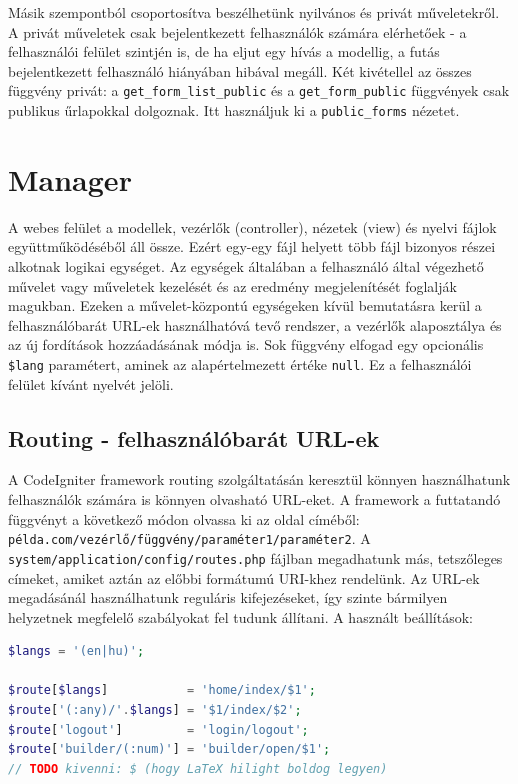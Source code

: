 \documentclass[12pt,a4paper,twoside]{article}
\begin{document}
Másik szempontból csoportosítva beszélhetünk nyilvános és privát műveletekről. A
privát műveletek csak bejelentkezett felhasználók számára elérhetőek - a
felhasználói felület szintjén is, de ha eljut egy hívás a modellig,
a futás bejelentkezett felhasználó hiányában hibával megáll. Két kivétellel az
összes függvény privát: a \texttt{get\_form\_list\_public} és a
\texttt{get\_form\_public} függvények csak publikus űrlapokkal dolgoznak. Itt
használjuk ki a \texttt{public\_forms} nézetet.


\section{Manager}

A webes felület a modellek, vezérlők (controller), nézetek (view) és nyelvi fájlok
együttműködéséből áll össze. Ezért egy-egy fájl helyett több fájl bizonyos
részei alkotnak logikai egységet. Az egységek általában a felhasználó által
végezhető művelet vagy műveletek kezelését és az eredmény megjelenítését foglalják
magukban. Ezeken a művelet-központú egységeken kívül bemutatásra kerül a
felhasználóbarát URL-ek használhatóvá tevő rendszer, a vezérlők alaposztálya
és az új fordítások hozzáadásának módja is. Sok függvény elfogad egy opcionális
\texttt{\$lang} paramétert, aminek az alapértelmezett értéke \texttt{null}. Ez a
felhasználói felület kívánt nyelvét jelöli.


\subsection{Routing - felhasználóbarát URL-ek}

A CodeIgniter framework routing\cite{CI-Routing} szolgáltatásán keresztül
könnyen használhatunk felhasználók számára is könnyen olvasható URL-eket.
A framework a futtatandó függvényt a következő módon olvassa ki az oldal
címéből: \texttt{példa.com/vezérlő/függvény/paraméter1/paraméter2}.
A \texttt{system/application/config/routes.php} fájlban megadhatunk más,
tetszőleges címeket, amiket aztán az előbbi formátumú URI-khez rendelünk. Az
URL-ek megadásánál használhatunk reguláris kifejezéseket\cite{regex}, így szinte
bármilyen helyzetnek megfelelő szabályokat fel tudunk állítani. A használt
beállítások:

\begin{lstlisting}[language=PHP, firstnumber=46]
$langs = '(en|hu)';

$route[$langs]           = 'home/index/$1';
$route['(:any)/'.$langs] = '$1/index/$2';
$route['logout']         = 'login/logout';
$route['builder/(:num)'] = 'builder/open/$1';
// TODO kivenni: $ (hogy LaTeX hilight boldog legyen)
\end{lstlisting}
\end{document}
